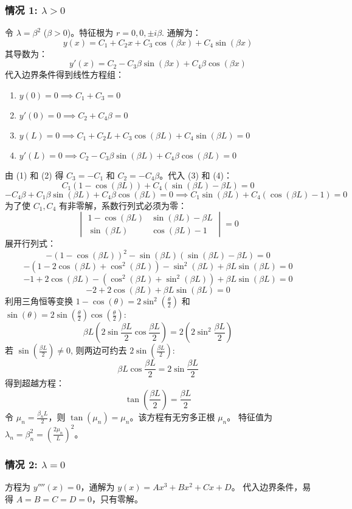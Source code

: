 \documentclass{article}
\begin{document}
	\subsubsection{情况 1: $\lambda > 0$}
	令 $\lambda = \beta^2$ ($\beta > 0$)。特征根为 $r = 0, 0, \pm i\beta$.
	通解为：
	$$
	y(x) = C_1 + C_2 x + C_3 \cos(\beta x) + C_4 \sin(\beta x)
	$$
	其导数为：
	$$
	y'(x) = C_2 - C_3 \beta \sin(\beta x) + C_4 \beta \cos(\beta x)
	$$
	代入边界条件得到线性方程组：
	\begin{enumerate}
		\item $y(0)=0 \implies C_1 + C_3 = 0$
		\item $y'(0)=0 \implies C_2 + C_4 \beta = 0$
		\item $y(L)=0 \implies C_1 + C_2 L + C_3 \cos(\beta L) + C_4 \sin(\beta L) = 0$
		\item $y'(L)=0 \implies C_2 - C_3 \beta \sin(\beta L) + C_4 \beta \cos(\beta L) = 0$
	\end{enumerate}
	由 (1) 和 (2) 得 $C_3 = -C_1$ 和 $C_2 = -C_4 \beta$。代入 (3) 和 (4)：
	$$
	C_1(1-\cos(\beta L)) + C_4(\sin(\beta L) - \beta L) = 0
	$$
	$$
	-C_4 \beta + C_1 \beta \sin(\beta L) + C_4 \beta \cos(\beta L) = 0 \implies C_1 \sin(\beta L) + C_4(\cos(\beta L) - 1) = 0
	$$
	为了使 $C_1, C_4$ 有非零解，系数行列式必须为零：
	$$
	\begin{vmatrix}
		1-\cos(\beta L) & \sin(\beta L) - \beta L \\
		\sin(\beta L) & \cos(\beta L) - 1
	\end{vmatrix} = 0
	$$
	展开行列式：
	$$
	-(1-\cos(\beta L))^2 - \sin(\beta L)(\sin(\beta L) - \beta L) = 0
	$$
	$$
	-(1 - 2\cos(\beta L) + \cos^2(\beta L)) - \sin^2(\beta L) + \beta L \sin(\beta L) = 0
	$$
	$$
	-1 + 2\cos(\beta L) - (\cos^2(\beta L) + \sin^2(\beta L)) + \beta L \sin(\beta L) = 0
	$$
	$$
	-2 + 2\cos(\beta L) + \beta L \sin(\beta L) = 0
	$$
	利用三角恒等变换 $1 - \cos(\theta) = 2\sin^2(\frac{\theta}{2})$ 和 $\sin(\theta) = 2\sin(\frac{\theta}{2})\cos(\frac{\theta}{2})$:
	$$
	\beta L \left(2\sin\frac{\beta L}{2}\cos\frac{\beta L}{2}\right) = 2\left(2\sin^2\frac{\beta L}{2}\right)
	$$
	若 $\sin(\frac{\beta L}{2}) \neq 0$, 则两边可约去 $2\sin(\frac{\beta L}{2})$:
	$$
	\beta L \cos\frac{\beta L}{2} = 2\sin\frac{\beta L}{2}
	$$
	得到超越方程：
	$$
	\tan\left(\frac{\beta L}{2}\right) = \frac{\beta L}{2}
	$$
	令 $\mu_n = \frac{\beta_n L}{2}$，则 $\tan(\mu_n) = \mu_n$。该方程有无穷多正根 $\mu_n$。
	特征值为 $\lambda_n = \beta_n^2 = \left(\frac{2\mu_n}{L}\right)^2$。
	
	\subsubsection{情况 2: $\lambda = 0$}
	方程为 $y''''(x)=0$，通解为 $y(x) = Ax^3 + Bx^2 + Cx + D$。
	代入边界条件，易得 $A=B=C=D=0$，只有零解。
	
\end{document}
